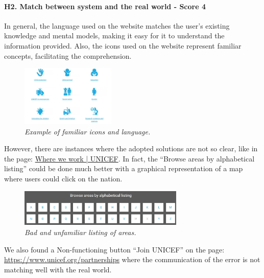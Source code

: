 \paragraph{H2. Match between system and the real world - Score 4} \label{subsec:H2}	In general, the language used on the website matches the user’s existing knowledge and mental models, making it easy for it to understand the information provided. Also, the icons used on the website represent familiar concepts, facilitating the comprehension.
\begin{figure}[!h]
	\begin{center}
		\includegraphics[width=0.4\textwidth]{FinalScores4.jpg}
		\captionsetup{font=small}
		\caption{\textit{Example of familiar icons and language.}}
	\end{center}
\end{figure}
\newline However, there are instances where the adopted solutions are not so clear, like in the page: \href{https://www.unicef.org/where-we-work}{Where we work | UNICEF}. In fact, the “Browse areas by alphabetical listing” could be done much better with a graphical representation of a map where users could click on the nation.
\begin{figure}[!h]
	\begin{center}
		\includegraphics[width=0.7\textwidth]{FinalScores5.jpg}
		\captionsetup{font=small}
		\caption{\textit{Bad and unfamiliar listing of areas.}}
	\end{center}
\end{figure}
\newline
\newline We also found a Non-functioning button “Join UNICEF” on the page: 
\newline \href{https://www.unicef.org/partnerships}{https://www.unicef.org/partnerships} where the communication of the error is not matching well with the real world.
